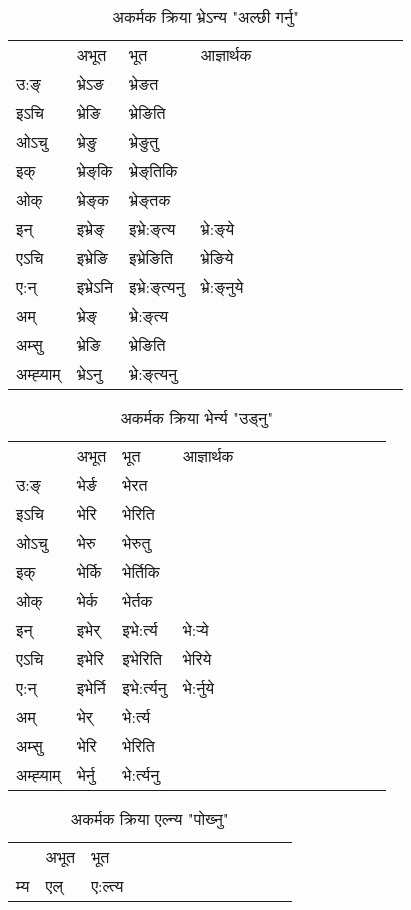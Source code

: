 \begin{table}[H]
\centering
\caption{\label{eŋ.vi} अकर्मक क्रिया  भ्रेऽन्य  "अल्छी गर्नु"  }
\begin{tabular}{l|l|l|l|l|l|l|l|l|l|l|l|l}  \toprule
&अभूत & भूत & आज्ञार्थक \\ 
उ:ङ्‌ &भ्रेऽङ &भ्रेङत \\ 
इऽचि &भ्रेङि &भ्रेङिति   \\ 
ओऽचु &भ्रेङु &भ्रेङुतु   \\ 
इक् &भ्रेङ्‌कि &भ्रेङ्‌तिकि   \\ 
ओक् &भ्रेङ्‌क &भ्रेङ्‌तक   \\ 
इन् & इभ्रेङ्‌ & इभ्रे:ङ्‌त्य &भ्रे:ङ्‌ये  \\ 
एऽचि & इभ्रेङि & इभ्रेङिति &भ्रेङिये    \\ 
ए:न् & इभ्रेऽनि  & इभ्रे:ङ्‌त्यनु &भ्रे:ङ्‌नुये  \\ 
अम् & भ्रेङ्‌ & भ्रे:ङ्‌त्य   \\ 
अम्सु & भ्रेङि & भ्रेङिति   \\ 
अम्ह्‍याम् & भ्रेऽनु  & भ्रे:ङ्‌त्यनु \\ 
\bottomrule
\end{tabular}
\end{table}


\begin{table}[H]
\centering
\caption{\label{er.vi} अकर्मक क्रिया  भेर्न्य  "उड्नु"  }
\begin{tabular}{l|l|l|l|l|l|l|l|l|l|l|l|l}  \toprule
&अभूत & भूत & आज्ञार्थक \\ 
उ:ङ्‌ &भेर्ङ &भेरत \\ 
इऽचि &भेरि &भेरिति   \\ 
ओऽचु &भेरु &भेरुतु   \\ 
इक् &भेर्कि &भेर्तिकि   \\ 
ओक् &भेर्क &भेर्तक   \\ 
इन् & इभेर् & इभे:र्त्य &भे:र्‍ये  \\ 
एऽचि & इभेरि & इभेरिति &भेरिये    \\ 
ए:न् & इभेर्नि  & इभे:र्त्यनु &भे:र्नुये  \\ 
अम् & भेर् & भे:र्त्य   \\ 
अम्सु & भेरि & भेरिति   \\ 
अम्ह्‍याम् & भेर्नु  & भे:र्त्यनु \\ 
\bottomrule
\end{tabular}
\end{table}


\begin{table}[H]
\centering
\caption{\label{el.vi} अकर्मक क्रिया  एल्न्य  "पोख्‍नु"  }
\begin{tabular}{l|l|l|l|l|l|l|l|l|l|l|l|l}  \toprule
&अभूत & भूत   \\ 
म्य & एल् & ए:ल्त्य   \\ 
\bottomrule
\end{tabular}
\end{table}


